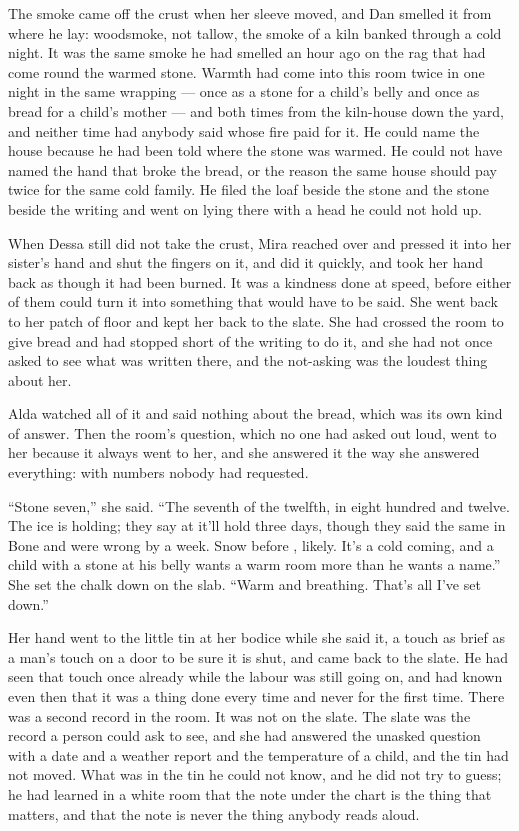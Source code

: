 The smoke came off the crust when her sleeve moved, and Dan smelled it from where he lay: woodsmoke, not tallow, the smoke of a kiln banked through a cold night. It was the same smoke he had smelled an hour ago on the rag that had come round the warmed stone. Warmth had come into this room twice in one night in the same wrapping --- once as a stone for a child's belly and once as bread for a child's mother --- and both times from the kiln-house down the yard, and neither time had anybody said whose fire paid for it. He could name the house because he had been told where the stone was warmed. He could not have named the hand that broke the bread, or the reason the same house should pay twice for the same cold family. He filed the loaf beside the stone and the stone beside the writing and went on lying there with a head he could not hold up.

When Dessa still did not take the crust, Mira reached over and pressed it into her sister's hand and shut the fingers on it, and did it quickly, and took her hand back as though it had been burned. It was a kindness done at speed, before either of them could turn it into something that would have to be said. She went back to her patch of floor and kept her back to the slate. She had crossed the room to give bread and had stopped short of the writing to do it, and she had not once asked to see what was written there, and the not-asking was the loudest thing about her.

Alda watched all of it and said nothing about the bread, which was its own kind of answer. Then the room's question, which no one had asked out loud, went to her because it always went to her, and she answered it the way she answered everything: with numbers nobody had requested.

“Stone seven,” she said. “The seventh of the twelfth, in eight hundred and twelve. The ice is holding; they say at  it'll hold three days, though they said the same in Bone and were wrong by a week. Snow before , likely. It's a cold coming, and a child with a stone at his belly wants a warm room more than he wants a name.” She set the chalk down on the slab. “Warm and breathing. That's all I've set down.”

Her hand went to the little tin at her bodice while she said it, a touch as brief as a man's touch on a door to be sure it is shut, and came back to the slate. He had seen that touch once already while the labour was still going on, and had known even then that it was a thing done every time and never for the first time. There was a second record in the room. It was not on the slate. The slate was the record a person could ask to see, and she had answered the unasked question with a date and a weather report and the temperature of a child, and the tin had not moved. What was in the tin he could not know, and he did not try to guess; he had learned in a white room that the note under the chart is the thing that matters, and that the note is never the thing anybody reads aloud.

